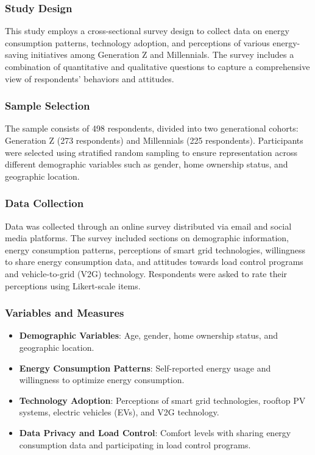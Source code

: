 \documentclass[
  letterpaper,
  DIV=11,
  numbers=noendperiod]{scrartcl}
\providecommand{\tightlist}{%
  \setlength{\itemsep}{0pt}\setlength{\parskip}{0pt}}\usepackage{longtable,booktabs,array}
\begin{document}
\subsubsection{Study Design}\label{study-design}

This study employs a cross-sectional survey design to collect data on
energy consumption patterns, technology adoption, and perceptions of
various energy-saving initiatives among Generation Z and Millennials.
The survey includes a combination of quantitative and qualitative
questions to capture a comprehensive view of respondents' behaviors and
attitudes.

\subsubsection{Sample Selection}\label{sample-selection}

The sample consists of 498 respondents, divided into two generational
cohorts: Generation Z (273 respondents) and Millennials (225
respondents). Participants were selected using stratified random
sampling to ensure representation across different demographic variables
such as gender, home ownership status, and geographic location.

\subsubsection{Data Collection}\label{data-collection}

Data was collected through an online survey distributed via email and
social media platforms. The survey included sections on demographic
information, energy consumption patterns, perceptions of smart grid
technologies, willingness to share energy consumption data, and
attitudes towards load control programs and vehicle-to-grid (V2G)
technology. Respondents were asked to rate their perceptions using
Likert-scale items.

\subsubsection{Variables and Measures}\label{variables-and-measures}

\begin{itemize}
\tightlist
\item
  \textbf{Demographic Variables}: Age, gender, home ownership status,
  and geographic location.
\item
  \textbf{Energy Consumption Patterns}: Self-reported energy usage and
  willingness to optimize energy consumption.
\item
  \textbf{Technology Adoption}: Perceptions of smart grid technologies,
  rooftop PV systems, electric vehicles (EVs), and V2G technology.
\item
  \textbf{Data Privacy and Load Control}: Comfort levels with sharing
  energy consumption data and participating in load control programs.
\end{itemize}
\end{document}
